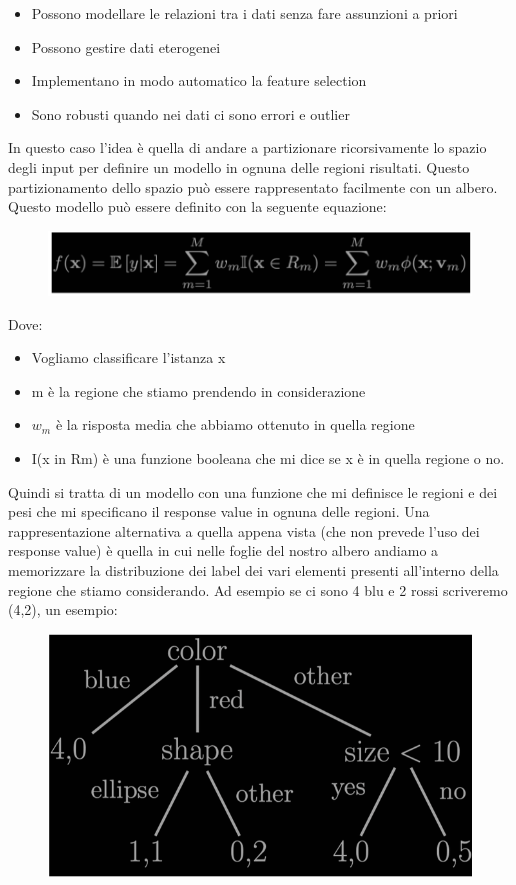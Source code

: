 \documentclass[14pt]{extreport}
\begin{document}
\begin{itemize}
	\item Possono modellare le relazioni tra i dati senza fare assunzioni a priori
	\item Possono gestire dati eterogenei
	\item Implementano in modo automatico la feature selection
	\item Sono robusti quando nei dati ci sono errori e outlier
\end{itemize} 


In questo caso l’idea è quella di andare a partizionare ricorsivamente lo spazio degli input per definire un modello in ognuna delle regioni risultati.
Questo partizionamento dello spazio può essere rappresentato facilmente con un albero.
Questo modello può essere definito con la seguente equazione:


\begin{figure}[H] 
	\centering
	\includegraphics[width=0.7\linewidth]{475.jpeg}
	\end{figure}

	Dove:
	\begin{itemize}
		\item Vogliamo classificare l’istanza x
		\item m è la regione che stiamo prendendo in considerazione
		\item $w_m$ è la risposta media che abbiamo ottenuto in quella regione 
		\item I(x in Rm) è una funzione booleana che mi dice se x è in quella regione o no.
	\end{itemize}


Quindi si tratta di un modello con una funzione che mi definisce le regioni e dei pesi che mi specificano il response value in ognuna delle regioni.
Una rappresentazione alternativa a quella appena vista (che non prevede l’uso dei response value) è quella in cui nelle foglie del nostro albero andiamo a memorizzare la distribuzione dei label dei vari elementi presenti all’interno della regione che stiamo considerando. Ad esempio se ci sono 4 blu e 2 rossi scriveremo (4,2), un esempio:


\begin{figure}[H] 
	\centering
	\includegraphics[width=0.7\linewidth]{476.jpeg}
	\end{figure}
\end{document}
